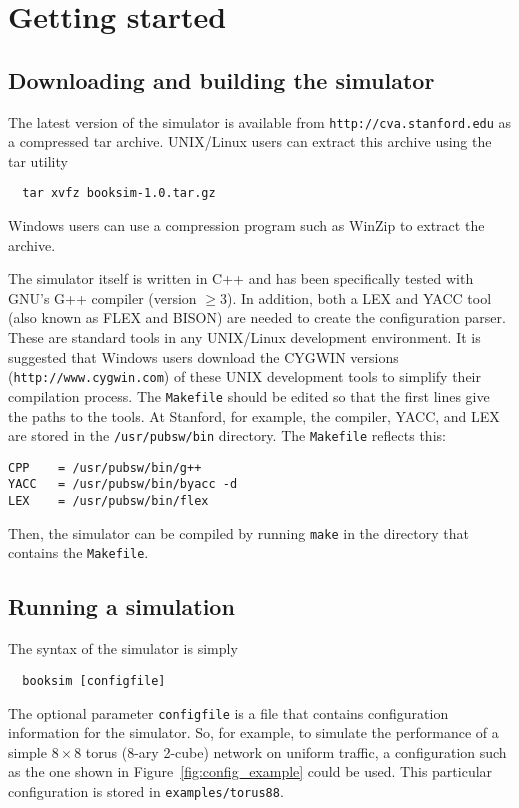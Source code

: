 \documentclass[11pt]{article}
\begin{document}
\section{Getting started}
\label{sec:get_started}

\subsection{Downloading and building the simulator}
\label{sec:download}

The latest version of the simulator is available from
\texttt{http://cva.stanford.edu} as a compressed tar archive.  UNIX/Linux
users can extract this archive using the tar utility
\begin{verbatim}
  tar xvfz booksim-1.0.tar.gz  
\end{verbatim}
Windows users can use a compression program such as WinZip to extract
the archive.

The simulator itself is written in C++ and has been specifically
tested with GNU's G++ compiler (version $\ge3$).  In addition, both a
LEX and YACC tool (also known as FLEX and BISON) are needed to create
the configuration parser.  These are standard tools in any UNIX/Linux
development environment.  It is suggested that Windows users download
the CYGWIN versions (\texttt{http://www.cygwin.com}) of these UNIX
development tools to simplify their compilation process.  The
\texttt{Makefile} should be edited so that the first lines give the
paths to the tools.  At Stanford, for example, the compiler, YACC, and
LEX are stored in the \texttt{/usr/pubsw/bin} directory.  The
\texttt{Makefile} reflects this:
\begin{verbatim}
CPP    = /usr/pubsw/bin/g++
YACC   = /usr/pubsw/bin/byacc -d
LEX    = /usr/pubsw/bin/flex
\end{verbatim}
Then, the simulator can be compiled by running \texttt{make} in the
directory that contains the \texttt{Makefile}.

\subsection{Running a simulation}
\label{sec:run_example}

The syntax of the simulator is simply
\begin{verbatim}
  booksim [configfile]
\end{verbatim}
The optional parameter \texttt{configfile} is a file that contains
configuration information for the simulator.  So, for example, to
simulate the performance of a simple $8 \times 8$ torus (8-ary 2-cube)
network on uniform traffic, a configuration such as the one shown in
Figure~\ref{fig:config_example} could be used.  This particular
configuration is stored in \texttt{examples/torus88}.
\end{document}
